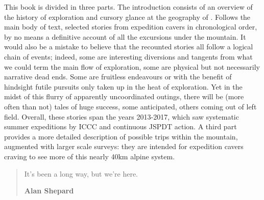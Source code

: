 
\mydelimiter

This book is divided in three parts. The introduction consists of an overview of the history of exploration and cursory glance at the geography of . Follows the main body of text, selected stories from expedition cavers in chronological order, by no means a definitive account of all the excursions under the mountain. It would also be a mistake to believe that the recounted stories all follow a logical chain of events; indeed, some are interesting diversions and tangents from what we could term the main flow of exploration, some are physical but not necessarily narrative dead ends. Some are fruitless endeavours or with the benefit of hindsight futile pursuits only taken up in the heat of exploration. Yet in the midst of this flurry of apparently uncoordinated outings, there will be (more often than not) tales of huge success, some anticipated, others coming out of left field. Overall, these stories span the years 2013-2017, which saw systematic summer expeditions by ICCC and continuous JSPDT action. A third part provides a more detailed description of possible trips within the mountain, augmented with larger scale surveys: they are intended for expedition cavers craving to see more of this nearly 40km alpine system. 

\mydelimiter

\begin{quote}
It's been a long way, but we're here.
 
\raggedleft\normalsize\sffamily\textbf{Alan Shepard} \par\end{quote}